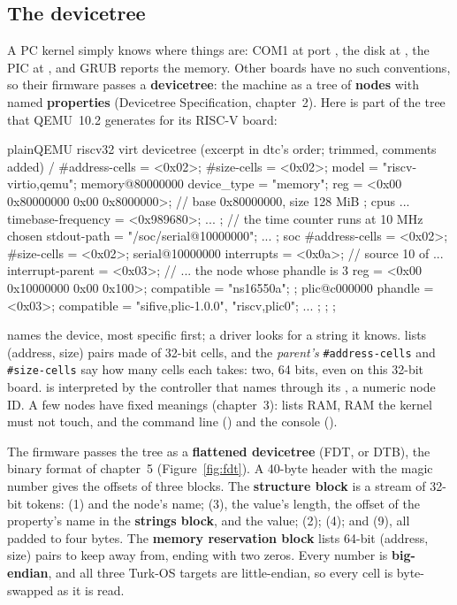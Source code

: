 \documentclass[11pt,a4paper]{article}
\begin{document}
\subsection{The devicetree}

A PC kernel simply knows where things are: COM1 at port , the disk at , the PIC at
, and GRUB reports the memory. Other boards have no such conventions, so their firmware passes a
\textbf{devicetree}: the machine as a tree of \textbf{nodes} with named \textbf{properties} (\SPEC Devicetree
Specification, chapter~2). Here is part of the tree that QEMU~10.2 generates for its RISC-V  board:

\begin{lst}{plain}{QEMU riscv32 virt devicetree (excerpt in dtc's order; trimmed, comments added)}
/ {
    #address-cells = <0x02>;
    #size-cells = <0x02>;
    model = "riscv-virtio,qemu";
    memory@80000000 {
        device_type = "memory";
        reg = <0x00 0x80000000 0x00 0x8000000>;   // base 0x80000000, size 128 MiB
    };
    cpus { ... timebase-frequency = <0x989680>; ... };   // the time counter runs at 10 MHz
    chosen { stdout-path = "/soc/serial@10000000"; ... };
    soc {
        #address-cells = <0x02>;
        #size-cells = <0x02>;
        serial@10000000 {
            interrupts = <0x0a>;                   // source 10 of ...
            interrupt-parent = <0x03>;             // ... the node whose phandle is 3
            reg = <0x00 0x10000000 0x00 0x100>;
            compatible = "ns16550a";
        };
        plic@c000000 { phandle = <0x03>; compatible = "sifive,plic-1.0.0", "riscv,plic0"; ... };
    };
};
\end{lst}

 names the device, most specific first; a driver looks for a string it knows.  lists
(address, size) pairs made of 32-bit cells, and the \emph{parent's} \texttt{\#address-cells} and \texttt{\#size-cells}
say how many cells each takes: two, 64 bits, even on this 32-bit board.  is interpreted by the
controller that  names through its , a numeric node ID. A few nodes have fixed
meanings (chapter~3):  lists RAM,  RAM the kernel must not touch, and
 the command line () and the console ().

The firmware passes the tree as a \textbf{flattened devicetree} (FDT, or DTB), the binary format of chapter~5
(Figure~\ref{fig:fdt}). A 40-byte header with the magic number  gives the offsets of three blocks.
The \textbf{structure block} is a stream of 32-bit tokens:  (1) and the node's name;
 (3), the value's length, the offset of the property's name in the \textbf{strings block}, and the
value;  (2);  (4); and  (9), all padded to four bytes. The
\textbf{memory reservation block} lists 64-bit (address, size) pairs to keep away from, ending with two zeros. Every
number is \textbf{big-endian}, and all three Turk-OS targets are little-endian, so every cell is byte-swapped as it is
read.
\end{document}
